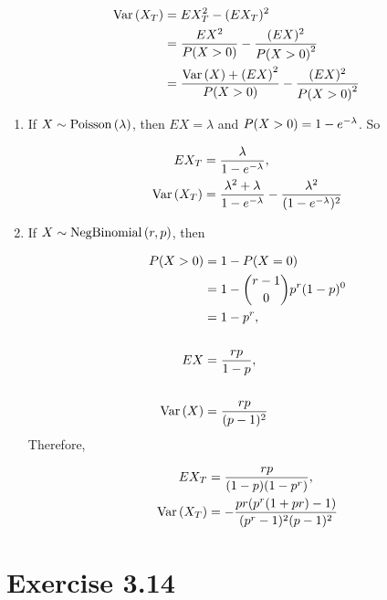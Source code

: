 \documentclass[12pt,letterpaper,reqno]{amsart}
\numberwithin{equation}{subsection}
\begin{document}
\begin{align}
    \operatorname{Var}\left( {X_T} \right) &= EX_T^2 - (EX_T)^2 \nonumber \\
              &= \frac{EX^2}{{P}\! \left( {X > 0} \right)} - \frac{(EX)^2}{{P}\! \left( {X>0} \right)^2} \nonumber \\
              &= \frac{\operatorname{Var}\left( {X} \right) + \left(EX \right)^2}{{P}\! \left( {X>0} \right)} - \frac{(EX)^2}{{P}\! \left( {X>0} \right)^2}
\end{align}

\begin{enumerate}[label=(\alph*),leftmargin=*]
    \item If $X \sim \operatorname{Poisson}\left( {\lambda} \right)$, then $EX = \lambda$ and ${P}\! \left( {X>0} \right) = 1-e^{-\lambda}$. So
    
    \begin{align*}
        EX_T &= \frac{\lambda}{1 - e^{-\lambda}}, \\
        \operatorname{Var}\left( {X_T} \right) &= \frac{\lambda^2 + \lambda}{1-e^{-\lambda}} - \frac{\lambda^2}{(1-e^{-\lambda})^2}
    \end{align*}
    
    \item If $X \sim \operatorname{NegBinomial}\left( {r, p} \right)$, then
    
    \begin{align*}
        {P}\! \left( {X>0} \right) &= 1 - {P}\! \left( {X = 0} \right) \\
                     &= 1 - \binom{r-1}{0} p^r (1-p)^0 \\
                     &= 1-p^r, \\
                     \\
        EX &= \frac{rp}{1-p}, \\
        \\
        \operatorname{Var}\left( {X} \right) &= \frac{rp}{(p-1)^2}
    \end{align*}
    Therefore,
    
    \begin{align*}
        EX_T &= \frac{rp}{(1-p)(1-p^r)}, \\
        \operatorname{Var}\left( {X_T} \right) &= -\frac{pr(p^r(1+pr)-1)}{(p^r-1)^2(p-1)^2}
    \end{align*}
\end{enumerate}

\newpage
\section{Exercise 3.14}
\end{document}
